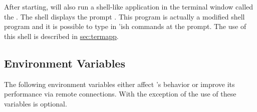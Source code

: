 After starting, \sr{} will also run a shell-like application in the
terminal window called the .  The \sr{} shell displays the
prompt .  This program is actually a modified  shell program and it is possible to type in
'ish \sr{} commands at the prompt. The use of this shell
is described in \hyperref{a later section}{Section~}{}{sec:termapp}.


\subsection{Environment Variables}
\label{sec:environ} 

\newcommand{\envitem}[1]{\item[\envvar{#1}]\latex{\mbox{}\\}}

The following environment variables either affect \sr{}'s behavior or
improve its performance via remote connections.  With the exception of
 the use of these variables is
optional.

